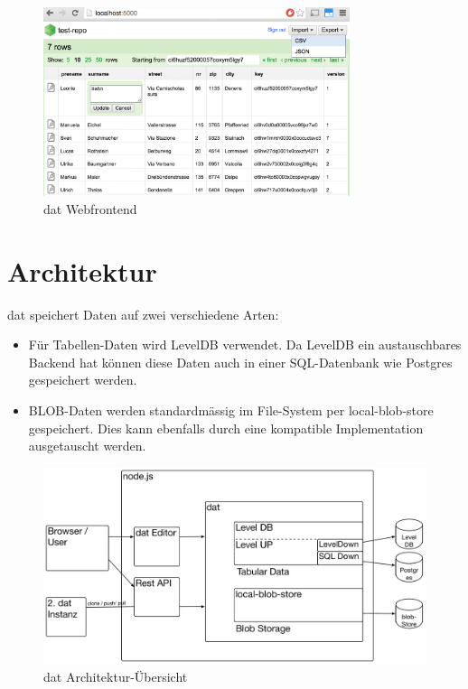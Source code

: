 \begin{figure}[H]
  \centering
  \includegraphics[width=0.8\textwidth]{fig/webfrontend}
  \caption{dat Webfrontend}
  \label{fig:dat:webfrontend}
\end{figure}


\section{Architektur}


dat speichert Daten auf zwei verschiedene Arten:
\begin{itemize}
\item Für Tabellen-Daten wird LevelDB verwendet. Da LevelDB ein austauschbares Backend hat können diese Daten auch in einer SQL-Datenbank wie Postgres gespeichert werden.
\item BLOB-Daten werden standardmässig im File-System per local-blob-store gespeichert. Dies kann ebenfalls durch eine kompatible Implementation ausgetauscht werden.
\end{itemize}

\begin{figure}[H]
  \centering
  \includegraphics[width=\linewidth,clip]{fig/dat-architecture}
  \caption{dat Architektur-Übersicht}
  \label{fig:dat-architecture-overview}
\end{figure}

